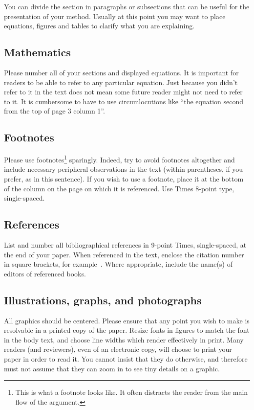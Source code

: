 \documentclass[10pt,twocolumn,letterpaper]{article}
\begin{document}
You can divide the section in paragraphs or subsections that can be useful for the presentation of your method. Usually at this point you may want to place equations, figures and tables to clarify what you are explaining.
\subsection{Mathematics}
Please number all of your sections and displayed equations.  It is
important for readers to be able to refer to any particular equation.  Just
because you didn't refer to it in the text does not mean some future reader
might not need to refer to it.  It is cumbersome to have to use
circumlocutions like ``the equation second from the top of page 3 column
1''.
\subsection{Footnotes}
Please use footnotes\footnote {This is what a footnote looks like.  It
often distracts the reader from the main flow of the argument.} sparingly.
Indeed, try to avoid footnotes altogether and include necessary peripheral
observations in
the text (within parentheses, if you prefer, as in this sentence).  If you
wish to use a footnote, place it at the bottom of the column on the page on
which it is referenced. Use Times 8-point type, single-spaced.
\subsection{References}
List and number all bibliographical references in 9-point Times,
single-spaced, at the end of your paper. When referenced in the text,
enclose the citation number in square brackets, for
example~\cite{Alpher04}.  Where appropriate, include the name(s) of
editors of referenced books.
\subsection{Illustrations, graphs, and photographs}
All graphics should be centered.  Please ensure that any point you wish to
make is resolvable in a printed copy of the paper.  Resize fonts in figures
to match the font in the body text, and choose line widths which render
effectively in print.  Many readers (and reviewers), even of an electronic
copy, will choose to print your paper in order to read it.  You cannot
insist that they do otherwise, and therefore must not assume that they can
zoom in to see tiny details on a graphic.
\end{document}
